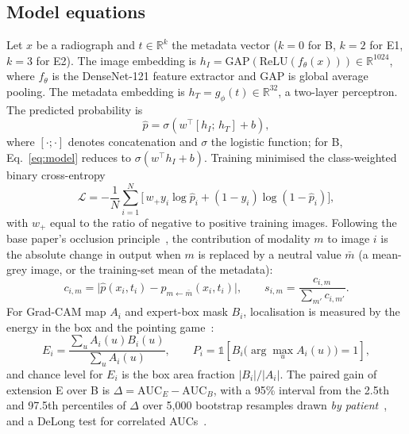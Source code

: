 \documentclass[conference]{IEEEtran}
\begin{document}
\subsection{Model equations}
Let $x$ be a radiograph and $t\in\mathbb{R}^k$ the metadata vector ($k=0$ for B, $k=2$ for E1, $k=3$ for E2). The image embedding is $h_I=\mathrm{GAP}(\mathrm{ReLU}(f_\theta(x)))\in\mathbb{R}^{1024}$, where $f_\theta$ is the DenseNet-121 feature extractor and GAP is global average pooling. The metadata embedding is $h_T=g_\phi(t)\in\mathbb{R}^{32}$, a two-layer perceptron. The predicted probability is
\begin{equation}
\hat p=\sigma\!\left(w^\top[h_I;\,h_T]+b\right),
\label{eq:model}
\end{equation}
where $[\cdot;\cdot]$ denotes concatenation and $\sigma$ the logistic function; for B, Eq.~\eqref{eq:model} reduces to $\sigma(w^\top h_I+b)$. Training minimised the class-weighted binary cross-entropy
\begin{equation}
\mathcal{L}=-\frac{1}{N}\sum_{i=1}^{N}\big[\,w_+ y_i\log\hat p_i+(1-y_i)\log(1-\hat p_i)\big],
\label{eq:loss}
\end{equation}
with $w_+$ equal to the ratio of negative to positive training images. Following the base paper's occlusion principle~\cite{gapp2025modality}, the contribution of modality $m$ to image $i$ is the absolute change in output when $m$ is replaced by a neutral value $\bar m$ (a mean-grey image, or the training-set mean of the metadata):
\begin{equation}
c_{i,m}=\big|\hat p(x_i,t_i)-\hat p_{m\leftarrow\bar m}(x_i,t_i)\big|,\qquad
s_{i,m}=\frac{c_{i,m}}{\sum_{m'}c_{i,m'}}.
\label{eq:share}
\end{equation}
For Grad-CAM map $A_i$ and expert-box mask $B_i$, localisation is measured by the energy in the box and the pointing game~\cite{zhang2018excitation}:
\begin{equation}
E_i=\frac{\sum_{u}A_i(u)B_i(u)}{\sum_u A_i(u)},\qquad
P_i=\mathbb{1}\!\left[B_i\big(\arg\max_u A_i(u)\big)=1\right],
\label{eq:energy}
\end{equation}
and chance level for $E_i$ is the box area fraction $|B_i|/|A_i|$. The paired gain of extension E over B is $\Delta=\mathrm{AUC}_E-\mathrm{AUC}_B$, with a 95\% interval from the 2.5th and 97.5th percentiles of $\Delta$ over 5,000 bootstrap resamples drawn \emph{by patient}~\cite{efron1993bootstrap}, and a DeLong test for correlated AUCs~\cite{delong1988auc}.

\end{document}
